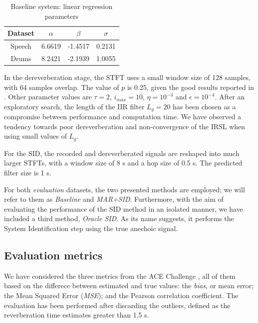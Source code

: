 \begin{table}[t]
\caption{Baseline system: linear regression parameters}
\begin{center}
\begin{tabular}{cccc}
\toprule
Dataset & $\alpha$  & $\beta$  & $\sigma$ \\
\midrule
Speech & 6.6619 & -1.4517 & 0.2131  \\
Drums  & 8.2421 & -2.1939 & 1.0055  \\
\bottomrule
\end{tabular}
\label{tab:fitting}
\end{center}
\end{table}

In the dereverberation stage, the STFT uses a small window size of 128 samples, with 64 samples overlap. The value of $p$ is 0.25, given the good results reported in \cite{jukic2015group}. Other parameter values are $\tau=2$, $i_{max} = 10$, $\eta=10^{-4}$ and  $\epsilon=10^{-4}$. After an exploratory search, the length of the IIR filter $L_g = 20$ has been chosen as a compromise between performance and computation time. 
We have observed a tendency towards poor dereverberation and non-convergence of the IRSL when using small values of $L_g$.

For the SID, the recorded and dereverberated signals are reshaped into much larger STFTs, with a window size of 8 s and a hop size of 0.5 s. The predicted filter size is 1 s. 

For both \textit{evaluation} datasets, the two presented methods are employed; we will refer to them as \textit{Baseline} and \textit{MAR+SID}. Furthermore, with the aim of evaluating the performance of the SID method in an isolated manner, we have included a third method, \textit{Oracle SID}. As its name suggests, it performs the System Identification step using the true anechoic signal.

\subsection{Evaluation metrics}
We have considered the three metrics from the ACE Challenge \cite{eaton2016estimation}, all of them based on the differece between estimated and true values: the \textit{bias}, or mean error; the Mean Squared Error (\textit{MSE}); and the Pearson correlation coefficient. The evaluation has been performed after discarding the outliers, defined as the reverberation time estimates greater than 1.5 s.


